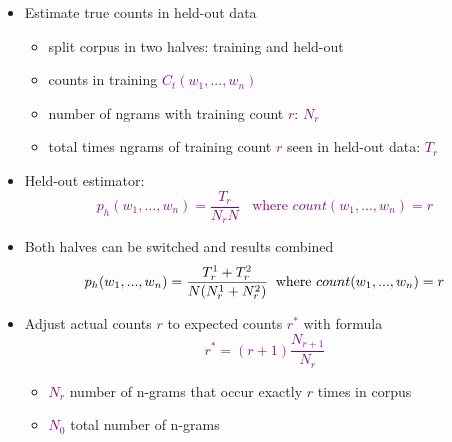 \documentclass[landscape]{slides}
\newcommand{\maths}[1]{\textcolor{purple}{#1}}
\begin{document}
\begin{itemize}
\item Estimate true counts in held-out data
\begin{itemize}
\item split corpus in two halves: training and held-out
\item counts in training \maths{$C_t(w_1,...,w_n)$}
\item number of ngrams with training count \maths{$r$}: \maths{$N_r$} 
\item total times ngrams of training count \maths{$r$} seen in held-out data: \maths{$T_r$}
\end{itemize}
\item Held-out estimator:
\vspace{-5mm}
\maths{\begin{equation*}
p_h(w_1,...,w_n)=\frac{T_r}{N_rN} \;\; \text{ where $count(w_1,...,w_n)=r$}
\end{equation*}}\vspace{-17mm}
\item Both halves can be switched and results combined
\maths{\begin{equation*}
p_h(w_1,...,w_n)=\frac{T_r^{1}+T_r^{2}}{N(N_r^{1}+N_r^{2})} \;\; \text{where $count(w_1,...,w_n)=r$}\vspace{-17mm}
\end{equation*}}
\end{itemize}


\vspace{25mm}
\begin{itemize}
\item Adjust actual counts \maths{$r$} to expected counts \maths{$r^*$} with formula
\maths{\begin{equation*}
r^* = (r+1) \frac{N_{r+1}}{N_r}
\end{equation*}}
\begin{itemize}
\item \maths{$N_r$} number of n-grams that occur exactly $r$ times in corpus \vspace{5mm}
\item \maths{$N_0$} total number of n-grams
\end{itemize}
\end{itemize}

\end{document}
